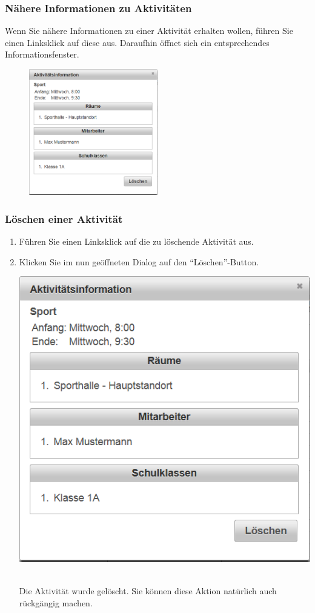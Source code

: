 \documentclass[fontsize=12pt]{scrartcl}
\begin{document}
\subsubsection{Nähere Informationen zu Aktivitäten}

Wenn Sie nähere Informationen zu einer Aktivität erhalten wollen, führen Sie einen Linksklick auf diese aus. Daraufhin öffnet sich ein entsprechendes Informationsfenster.

\begin{figure}[H]
\centering
\includegraphics[width=0.5\textwidth]{images/activityInfo.png}
\end{figure}

\subsubsection{Löschen einer Aktivität}
\begin{enumerate}
\item Führen Sie einen Linksklick auf die zu löschende Aktivität aus.
\item Klicken Sie im nun geöffneten Dialog auf den "`Löschen"'-Button. \medskip\\
	\begin{minipage}[t]{\linewidth}
            \includegraphics[width=.5\linewidth]{images/activityInfo.png}
    \end{minipage} 
    \medskip\\
    Die Aktivität wurde gelöscht. Sie können diese Aktion natürlich auch rückgängig machen.
\end{enumerate}
\end{document}
